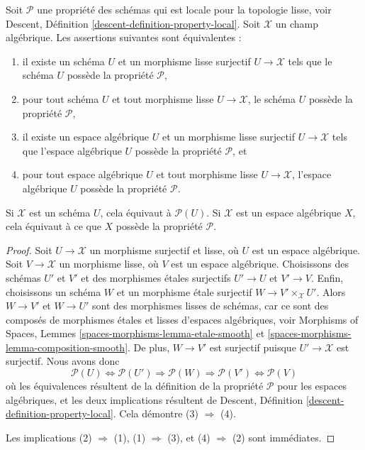 \begin{lemma}
\label{lemma-type-property}
Soit $\mathcal{P}$ une propriété des schémas qui est locale pour la topologie
lisse, voir
Descent, Définition \ref{descent-definition-property-local}.
Soit $\mathcal{X}$ un champ algébrique. Les assertions suivantes sont équivalentes :
\begin{enumerate}
\item il existe un schéma $U$ et un morphisme lisse surjectif
$U \to \mathcal{X}$ tels que le schéma $U$ possède la propriété $\mathcal{P}$,
\item pour tout schéma $U$ et tout morphisme lisse $U \to \mathcal{X}$,
le schéma $U$ possède la propriété $\mathcal{P}$,
\item il existe un espace algébrique $U$ et un morphisme lisse surjectif
$U \to \mathcal{X}$ tels que l'espace algébrique $U$ possède la propriété $\mathcal{P}$, et
\item pour tout espace algébrique $U$ et tout morphisme lisse
$U \to \mathcal{X}$, l'espace algébrique $U$ possède la propriété $\mathcal{P}$.
\end{enumerate}
Si $\mathcal{X}$ est un schéma $U$, cela équivaut à $\mathcal{P}(U)$.
Si $\mathcal{X}$ est un espace algébrique $X$, cela équivaut à ce que
$X$ possède la propriété $\mathcal{P}$.
\end{lemma}

\begin{proof}
Soit $U \to \mathcal{X}$ un morphisme surjectif et lisse, où $U$ est un espace algébrique.
Soit $V \to \mathcal{X}$ un morphisme lisse, où $V$ est un espace algébrique.
Choisissons des schémas $U'$ et $V'$ et des morphismes \'etales surjectifs
$U' \to U$ et $V' \to V$. Enfin, choisissons un schéma $W$ et un
morphisme \'etale surjectif $W \to V' \times_\mathcal{X} U'$.
Alors $W \to V'$ et $W \to U'$ sont des morphismes lisses de schémas,
car ce sont des composés de morphismes \'etales et lisses d'espaces algébriques, voir
Morphisms of Spaces, Lemmes \ref{spaces-morphisms-lemma-etale-smooth} et
\ref{spaces-morphisms-lemma-composition-smooth}.
De plus, $W \to V'$ est surjectif puisque $U' \to \mathcal{X}$ est surjectif.
Nous avons donc
$$
\mathcal{P}(U) \Leftrightarrow
\mathcal{P}(U') \Rightarrow
\mathcal{P}(W) \Rightarrow
\mathcal{P}(V') \Leftrightarrow \mathcal{P}(V)
$$
où les équivalences résultent de la définition de la propriété $\mathcal{P}$ pour les
espaces algébriques, et les deux implications résultent de
Descent, Définition \ref{descent-definition-property-local}.
Cela démontre (3) $\Rightarrow$ (4).

\medskip\noindent
Les implications (2) $\Rightarrow$ (1), (1) $\Rightarrow$ (3),
et (4) $\Rightarrow$ (2) sont immédiates.
\end{proof}

